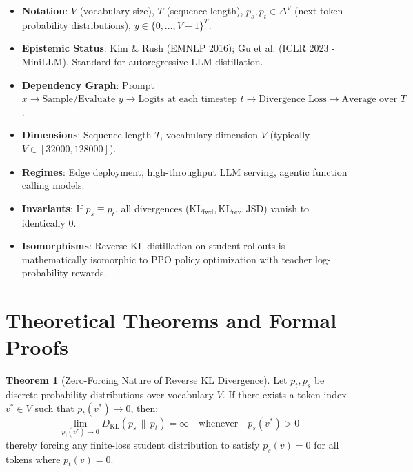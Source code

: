 \documentclass[11pt,a4paper]{article}
\theoremstyle{definition}
\newtheorem{theorem}{\textbf{Theorem}}[section]
\begin{document}
\begin{itemize}
    \item \textbf{Notation}: $V$ (vocabulary size), $T$ (sequence length), $p_s, p_t \in \Delta^V$ (next-token probability distributions), $y \in \{0, \dots, V-1\}^T$.
    \item \textbf{Epistemic Status}: Kim \& Rush (EMNLP 2016); Gu et al. (ICLR 2023 - MiniLLM). Standard for autoregressive LLM distillation.
    \item \textbf{Dependency Graph}: Prompt $x \to \text{Sample/Evaluate } y \to \text{Logits at each timestep } t \to \text{Divergence Loss} \to \text{Average over } T$.
    \item \textbf{Dimensions}: Sequence length $T$, vocabulary dimension $V$ (typically $V \in [32000, 128000]$).
    \item \textbf{Regimes}: Edge deployment, high-throughput LLM serving, agentic function calling models.
    \item \textbf{Invariants}: If $p_s \equiv p_t$, all divergences ($\text{KL}_{\text{fwd}}, \text{KL}_{\text{rev}}, \text{JSD}$) vanish to identically $0$.
    \item \textbf{Isomorphisms}: Reverse KL distillation on student rollouts is mathematically isomorphic to PPO policy optimization with teacher log-probability rewards.
\end{itemize}

\section{Theoretical Theorems and Formal Proofs}

\begin{theorem}[Zero-Forcing Nature of Reverse KL Divergence]
Let $p_t, p_s$ be discrete probability distributions over vocabulary $V$. If there exists a token index $v^* \in V$ such that $p_t(v^*) \to 0$, then:
{\boldmath
\begin{equation}
\lim_{p_t(v^*) \to 0} D_{\text{KL}}(p_s \,\|\, p_t) = \infty \quad \text{whenever} \quad p_s(v^*) > 0
\end{equation}
}
thereby forcing any finite-loss student distribution to satisfy $p_s(v) = 0$ for all tokens where $p_t(v) = 0$.
\end{theorem}
\end{document}
